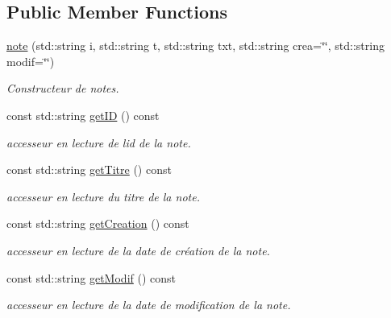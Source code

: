 \subsection*{Public Member Functions}
\begin{DoxyCompactItemize}
\item 
\hyperlink{classnote_a020b9fbf3603286e010cee5454195302}{note} (std\+::string i, std\+::string t, std\+::string txt, std\+::string crea=\char`\"{}\char`\"{}, std\+::string modif=\char`\"{}\char`\"{})
\begin{DoxyCompactList}\small\item\em Constructeur de notes. \end{DoxyCompactList}\item 
\mbox{\label{classnote_a6308957958b5b3b0d82d62d504bbc670}} 
const std\+::string \hyperlink{classnote_a6308957958b5b3b0d82d62d504bbc670}{get\+ID} () const
\begin{DoxyCompactList}\small\item\em accesseur en lecture de l\textquotesingle{}id de la note. \end{DoxyCompactList}\item 
\mbox{\label{classnote_aa22a099db95d5c357f19838fabe3e5fb}} 
const std\+::string \hyperlink{classnote_aa22a099db95d5c357f19838fabe3e5fb}{get\+Titre} () const
\begin{DoxyCompactList}\small\item\em accesseur en lecture du titre de la note. \end{DoxyCompactList}\item 
\mbox{\label{classnote_a5b11e6f329d9b94c80ce7c3bcc2e303f}} 
const std\+::string \hyperlink{classnote_a5b11e6f329d9b94c80ce7c3bcc2e303f}{get\+Creation} () const
\begin{DoxyCompactList}\small\item\em accesseur en lecture de la date de création de la note. \end{DoxyCompactList}\item 
\mbox{\label{classnote_a9ca3911596e876e0747a1ff803a7d930}} 
const std\+::string \hyperlink{classnote_a9ca3911596e876e0747a1ff803a7d930}{get\+Modif} () const
\begin{DoxyCompactList}\small\item\em accesseur en lecture de la date de modification de la note. \end{DoxyCompactList}\item 

\end{DoxyCompactItemize}
